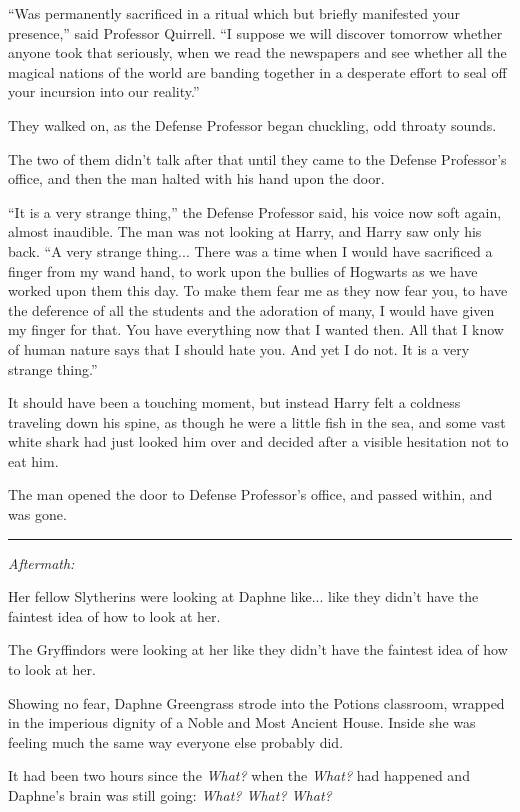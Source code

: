 ``Was permanently sacrificed in a ritual which but briefly manifested your presence,'' said Professor Quirrell. ``I suppose we will discover tomorrow whether anyone took that seriously, when we read the newspapers and see whether all the magical nations of the world are banding together in a desperate effort to seal off your incursion into our reality.''

They walked on, as the Defense Professor began chuckling, odd throaty sounds.

The two of them didn't talk after that until they came to the Defense Professor's office, and then the man halted with his hand upon the door.

``It is a very strange thing,'' the Defense Professor said, his voice now soft again, almost inaudible. The man was not looking at Harry, and Harry saw only his back. ``A very strange thing... There was a time when I would have sacrificed a finger from my wand hand, to work upon the bullies of Hogwarts as we have worked upon them this day. To make them fear me as they now fear you, to have the deference of all the students and the adoration of many, I would have given my finger for that. You have everything now that I wanted then. All that I know of human nature says that I should hate you. And yet I do not. It is a very strange thing.''

It should have been a touching moment, but instead Harry felt a coldness traveling down his spine, as though he were a little fish in the sea, and some vast white shark had just looked him over and decided after a visible hesitation not to eat him.

The man opened the door to Defense Professor's office, and passed within, and was gone.

\begin{center}\rule{3in}{0.4pt}\end{center}

\emph{Aftermath:}

Her fellow Slytherins were looking at Daphne like... like they didn't have the faintest idea of how to look at her.

The Gryffindors were looking at her like they didn't have the faintest idea of how to look at her.

Showing no fear, Daphne Greengrass strode into the Potions classroom, wrapped in the imperious dignity of a Noble and Most Ancient House. Inside she was feeling much the same way everyone else probably did.

It had been two hours since the \emph{What?} when the \emph{What?} had happened and Daphne's brain was still going: \emph{What? What? What?}

